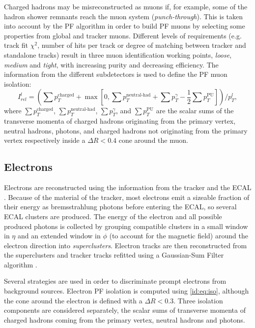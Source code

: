 \documentclass[../main.tex]{subfiles}
\begin{document}
Charged hadrons may be misreconstructed as muons if, for example, some of the hadron shower remnants reach the muon system (\textit{punch-through}). This is taken into account by the PF algorithm in order to build PF muons by selecting some properties from global and tracker muons. Different levels of requirements (e.g. track fit $\chi^2$, number of hits per track or degree of matching between tracker and standalone tracks) result in three muon identification working points, \textit{loose}, \textit{medium} and \textit{tight}, with increasing purity and decreasing efficiency. The information from the different subdetectors is used to define the PF muon isolation:
\begin{equation}
	I_{rel}^l = \left(\sum p_T^{\text{charged}} + \max \left[ 0, \sum p_T^{\text{neutral-had}}  + \sum p_T^\gamma - \frac{1}{2}\sum p_T^{\text{PU}}	
	 \right] \right) / p_T^l,
\label{id:eq:iso}
\end{equation}
where $\sum p_T^{\text{charged}}$, $\sum p_T^{\text{neutral-had}}$, $\sum p_T^\gamma$, and $\sum p_T^{\text{PU}}$ are the scalar sums of the transverse momenta of charged hadrons originating from the primary vertex, neutral hadrons, photons, and charged hadrons not originating from the primary vertex respectively inside a $\Delta R < 0.4$ cone around the muon.

\subsection{Electrons}
\label{intro:subsec:ele}

Electrons are reconstructed using the information from the tracker and the ECAL \cite{intro:id:ele}. Because of the material of the tracker, most electrons emit a sizeable fraction of their energy as bremsstrahlung photons before entering the ECAL, so several ECAL clusters are produced. The energy of the electron and all possible produced photons is collected by grouping compatible clusters in a small window in $\eta$ and an extended window in $\phi$ (to account for the magnetic field) around the electron direction into \textit{superclusters}. Electron tracks are then reconstructed from the superclusters and tracker tracks refitted using a Gaussian-Sum Filter algorithm \cite{intro:id:gsf}.

Several strategies are used in order to discriminate prompt electrons from background sources. Electron PF isolation is computed using \eqref{id:eq:iso}, although the cone around the electron is defined with a $\Delta R < 0.3$. Three isolation components are considered separately, the scalar sums of transverse momenta of charged hadrons coming from the primary vertex, neutral hadrons and photons.
\end{document}
